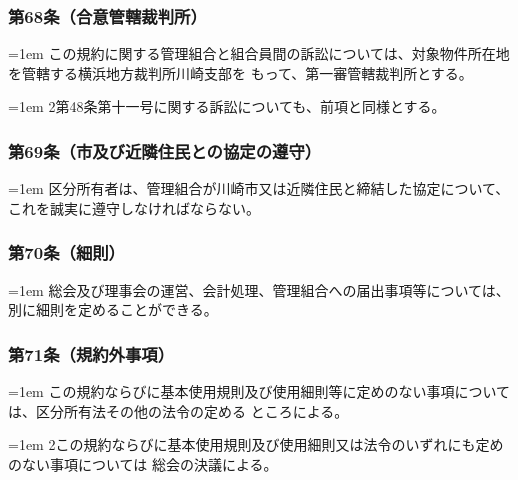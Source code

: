 \documentclass[
  luatex,
  paper=a4paper,
  fontsize=11pt,
  jafontsize=11pt,
  jlreq_notes,
]{jlreq}
\newcommand{\joumain}[1]{%
  \noindent\hangindent=1em\hangafter=1
  \hspace{1em}#1%
}
\newcommand{\kou}[2]{%
  \par\noindent\hangindent=1em\hangafter=1
  #1\hspace{1em}#2%
}
\begin{document}
  \subsubsection*{第68条（合意管轄裁判所）}
  \joumain{この規約に関する管理組合と組合員間の訴訟については、対象物件所在地を管轄する横浜地方裁判所川崎支部を
  もって、第一審管轄裁判所とする。}
  \kou{2}{第48条第十一号に関する訴訟についても、前項と同様とする。}

  \subsubsection*{第69条（市及び近隣住民との協定の遵守）}
  \joumain{区分所有者は、管理組合が川崎市又は近隣住民と締結した協定について、これを誠実に遵守しなければならない。}

  \subsubsection*{第70条（細則）}
  \joumain{総会及び理事会の運営、会計処理、管理組合への届出事項等については、別に細則を定めることができる。}

  \subsubsection*{第71条（規約外事項）}
  \joumain{この規約ならびに基本使用規則及び使用細則等に定めのない事項については、区分所有法その他の法令の定める
  ところによる。}
  \kou{2}{この規約ならびに基本使用規則及び使用細則又は法令のいずれにも定めのない事項については
  総会の決議による。}
\end{document}
